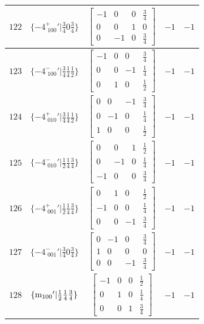 \documentclass[fleqn,8pt]{jsarticle}
\begin{document}
\begin{longtable}{ccccc}
$ 122 $ & $ \{-4^{+}_{\,\,100}{}'|\frac{3}{4} 0 \frac{3}{4}\} $ & $ \begin{bmatrix} -1 & 0 & 0 & \frac{3}{4} \\ 0 & 0 & 1 & 0 \\ 0 & -1 & 0 & \frac{3}{4} \end{bmatrix} $ & $ -1 $ & $ -1 $ \\ \hline
$ 123 $ & $ \{-4^{-}_{\,\,100}{}'|\frac{3}{4} \frac{1}{4} \frac{1}{2}\} $ & $ \begin{bmatrix} -1 & 0 & 0 & \frac{3}{4} \\ 0 & 0 & -1 & \frac{1}{4} \\ 0 & 1 & 0 & \frac{1}{2} \end{bmatrix} $ & $ -1 $ & $ -1 $ \\ \hline
$ 124 $ & $ \{-4^{+}_{\,\,010}{}'|\frac{3}{4} \frac{1}{4} \frac{1}{2}\} $ & $ \begin{bmatrix} 0 & 0 & -1 & \frac{3}{4} \\ 0 & -1 & 0 & \frac{1}{4} \\ 1 & 0 & 0 & \frac{1}{2} \end{bmatrix} $ & $ -1 $ & $ -1 $ \\ \hline
$ 125 $ & $ \{-4^{-}_{\,\,010}{}'|\frac{1}{2} \frac{1}{4} \frac{3}{4}\} $ & $ \begin{bmatrix} 0 & 0 & 1 & \frac{1}{2} \\ 0 & -1 & 0 & \frac{1}{4} \\ -1 & 0 & 0 & \frac{3}{4} \end{bmatrix} $ & $ -1 $ & $ -1 $ \\ \hline
$ 126 $ & $ \{-4^{+}_{\,\,001}{}'|\frac{1}{2} \frac{1}{4} \frac{3}{4}\} $ & $ \begin{bmatrix} 0 & 1 & 0 & \frac{1}{2} \\ -1 & 0 & 0 & \frac{1}{4} \\ 0 & 0 & -1 & \frac{3}{4} \end{bmatrix} $ & $ -1 $ & $ -1 $ \\ \hline
$ 127 $ & $ \{-4^{-}_{\,\,001}{}'|\frac{3}{4} 0 \frac{3}{4}\} $ & $ \begin{bmatrix} 0 & -1 & 0 & \frac{3}{4} \\ 1 & 0 & 0 & 0 \\ 0 & 0 & -1 & \frac{3}{4} \end{bmatrix} $ & $ -1 $ & $ -1 $ \\ \hline
$ 128 $ & $ \{{\rm m}_{100}{}'|\frac{1}{2} \frac{1}{4} \frac{3}{4}\} $ & $ \begin{bmatrix} -1 & 0 & 0 & \frac{1}{2} \\ 0 & 1 & 0 & \frac{1}{4} \\ 0 & 0 & 1 & \frac{3}{4} \end{bmatrix} $ & $ -1 $ & $ -1 $ \\ \hline

\end{longtable}
\end{document}
